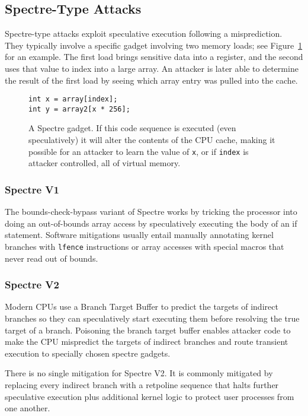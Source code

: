 \subsection{Spectre-Type Attacks}

Spectre-type attacks exploit speculative execution following a misprediction.
They typically involve a specific gadget involving two memory loads; see Figure~\ref{fig:spectre-gadget} for an example.
The first load brings sensitive data into a register, and the second uses that value to index into a large array.
An attacker is later able to determine the result of the first load by seeing which array entry was pulled into the cache.

\begin{figure}[h]
\begin{lstlisting}
int x = array[index];
int y = array2[x * 256];
\end{lstlisting}
\caption{A Spectre gadget. If this code sequence is executed (even speculatively) it will alter the contents of the CPU cache, making it possible for an attacker to learn the value of \texttt{x}, or if \texttt{index} is attacker controlled, all of virtual memory. }
\label{fig:spectre-gadget}
\end{figure}

\subsubsection{Spectre V1}
The bounds-check-bypass variant of Spectre works by tricking the processor into doing an out-of-bounds array access by speculatively executing the body of an if statement.
Software mitigations usually entail manually annotating kernel branches with \texttt{lfence} instructions or array accesses with special macros that never read out of bounds.

\subsubsection{Spectre V2}

Modern CPUs use a Branch Target Buffer to predict the targets of indirect branches so they can speculatively start executing them before resolving the true target of a branch.
Poisoning the branch target buffer enables attacker code to make the CPU mispredict the targets of indirect branches and route transient execution to specially chosen spectre gadgets.

There is no single mitigation for Spectre V2.
It is commonly mitigated by replacing every indirect branch with a retpoline sequence \cite{intel:retpoline} that halts further speculative execution plus additional kernel logic to protect user processes from one another.

